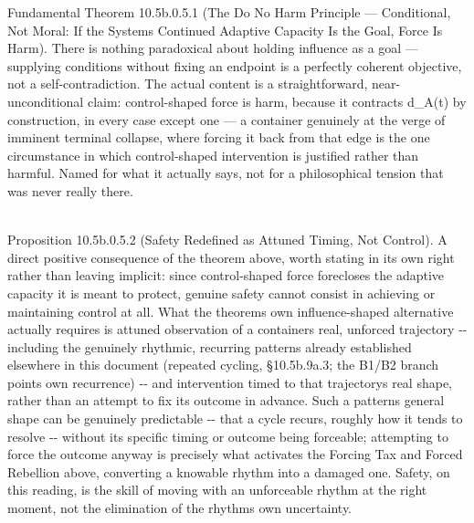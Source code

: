 \documentclass[
]{article}
\begin{document}
Fundamental Theorem 10.5b.0.5.1 (The Do No Harm Principle ---
Conditional, Not Moral: If the Systems Continued Adaptive Capacity Is
the Goal, Force Is Harm). There is nothing paradoxical about holding
influence as a goal --- supplying conditions without fixing an endpoint
is a perfectly coherent objective, not a self-contradiction. The actual
content is a straightforward, near-unconditional claim: control-shaped
force is harm, because it contracts d\_A(t) by construction, in every
case except one --- a container genuinely at the verge of imminent
terminal collapse, where forcing it back from that edge is the one
circumstance in which control-shaped intervention is justified rather
than harmful. Named for what it actually says, not for a philosophical
tension that was never really there.\\
\strut \\
Proposition 10.5b.0.5.2 (Safety Redefined as Attuned Timing, Not
Control). A direct positive consequence of the theorem above, worth
stating in its own right rather than leaving implicit: since
control-shaped force forecloses the adaptive capacity it is meant to
protect, genuine safety cannot consist in achieving or maintaining
control at all. What the theorem\textquotesingle s own influence-shaped
alternative actually requires is attuned observation of a
container\textquotesingle s real, unforced trajectory -\/- including the
genuinely rhythmic, recurring patterns already established elsewhere in
this document (repeated cycling, §10.5b.9a.3; the B1/B2 branch
point\textquotesingle s own recurrence) -\/- and intervention timed to
that trajectory\textquotesingle s real shape, rather than an attempt to
fix its outcome in advance. Such a pattern\textquotesingle s general
shape can be genuinely predictable -\/- that a cycle recurs, roughly how
it tends to resolve -\/- without its specific timing or outcome being
forceable; attempting to force the outcome anyway is precisely what
activates the Forcing Tax and Forced Rebellion above, converting a
knowable rhythm into a damaged one. Safety, on this reading, is the
skill of moving with an unforceable rhythm at the right moment, not the
elimination of the rhythm\textquotesingle s own uncertainty.
\end{document}
